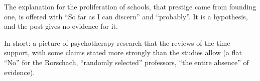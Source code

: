 \begin{afterword}
The explanation for the proliferation of schools, that prestige came from founding one, is offered with ``So far as I can discern'' and ``probably''. It is a hypothesis, and the post gives no evidence for it.

In short: a picture of psychotherapy research that the reviews of the time support, with some claims stated more strongly than the studies allow (a flat ``No'' for the Rorschach, ``randomly selected'' professors, ``the entire absence'' of evidence).
\end{afterword}
